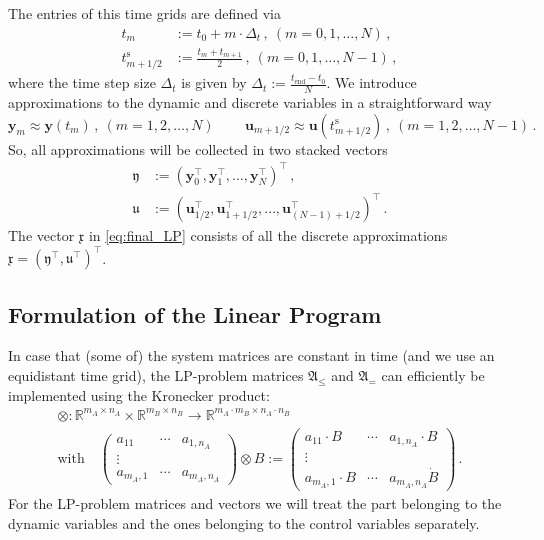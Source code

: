 \documentclass{article}
\newcommand{\defeq}{\mathrel{:=}}%
\newcommand{\tp}{\top}%
\newcommand{\kron}{\otimes}%
\newcommand{\setR}{\mathbb{R}}%
\newcommand{\vectorfont}[1]{\boldsymbol{#1}}%
\newcommand{\matrixfont}[1]{\mathbf{#1}}%
\newcommand{\uvec}{\vectorfont{u}}
\newcommand{\yvec}{\vectorfont{y}}
\newcommand{\ufrakvec}{\vectorfont{\mathfrak{u}}}
\newcommand{\xfrakvec}{\vectorfont{\mathfrak{x}}}
\newcommand{\yfrakvec}{\vectorfont{\mathfrak{y}}}
\newcommand{\Afrakmat}{\matrixfont{\mathfrak{A}}}
\begin{document}
The entries of this time grids are defined via
\begin{equation*}
\begin{split}
t_m &\defeq t_0 + m \cdot \Delta_t \,,~(m = 0,1,\ldots, N)\,,
\\
t_{m+1/2}^{\mathrm{s}} &\defeq \frac{t_m + t_{m+1}}{2}\,,~(m=0,1,\ldots,N-1)\,,
\end{split}
\end{equation*}
where the time step size $\Delta_t$ is given by $\Delta_t \defeq \frac{t_{\mathrm{end}} - t_0}{N}$.
We introduce approximations to the dynamic and discrete variables in a straightforward way
\[
\yvec_m \approx \yvec (t_m)\,,~(m=1,2,\ldots,N)\,\qquad
\uvec_{m+1/2} \approx \uvec (t_{m+1/2}^{\mathrm{s}})\,,~(m=1,2,\ldots,N-1)\,.
\]
So, all approximations will be collected in two stacked vectors
\begin{equation*}
\begin{split}
\yfrakvec &\defeq (\yvec_0^{\tp}, \yvec_1^{\tp} , \ldots , \yvec_{N}^{\tp})^{\tp}\,,
\\
\ufrakvec &\defeq (\uvec_{1/2}^{\tp}, \uvec_{1+1/2}^{\tp}, \ldots , \uvec_{(N-1)+1/2}^{\tp})^{\tp}\,.
\end{split}
\end{equation*}
The vector $\xfrakvec$ in \eqref{eq:final_LP} consists of all the discrete approximations $\xfrakvec = (\yfrakvec^{\tp},\ufrakvec^{\tp})^{\tp}$.


\subsection*{Formulation of the Linear Program}

In case that (some of) the system matrices are constant in time (and we use an equidistant time grid), the LP-problem matrices $\Afrakmat_{\leq}$ and $\Afrakmat_{=}$ can efficiently be implemented using the Kronecker product:
\begin{multline*}
\kron \colon \setR^{m_A \times n_A} \times \setR^{m_B \times n_B} \to \setR^{m_A \cdot m_B \times n_A \cdot n_B}\\
\text{with}\quad
\begin{pmatrix} a_{11} & \cdots & a_{1,n_A} \\ \vdots \\ a_{m_A, 1} & \cdots & a_{m_A, n_A}\end{pmatrix}
\kron B \defeq 
\begin{pmatrix} a_{11}\cdot B & \cdots & a_{1,n_A}\cdot B \\ \vdots \\ a_{m_A, 1}\cdot B & \cdots & a_{m_A, n_A} \dot B\end{pmatrix}\,.
\end{multline*}
For the LP-problem matrices and vectors we will treat the part belonging to the dynamic variables and the ones belonging to the control variables separately.
\end{document}
